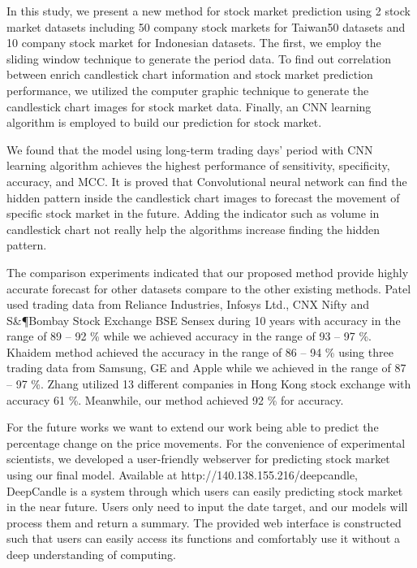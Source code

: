 \documentclass[10pt,twocolumn]{article}
\begin{document}
In this study, we present a new method for stock market prediction using 2 stock market datasets including 50 company stock markets for Taiwan50 datasets and 10 company stock market for Indonesian datasets. The first, we employ the sliding window technique to generate the period data. To find out correlation between enrich candlestick chart information and stock market prediction performance, we utilized the computer graphic technique to generate the candlestick chart images for stock market data. Finally, an CNN learning algorithm is employed to build our prediction for stock market.
\par
We found that the model using long-term trading days’ period with CNN learning algorithm achieves the highest performance of sensitivity, specificity, accuracy, and MCC. It is proved that Convolutional neural network can find the hidden pattern inside the candlestick chart images to forecast the movement of specific stock market in the future. Adding the indicator such as volume in candlestick chart not really help the algorithms increase finding the hidden pattern.
\par
The comparison experiments indicated that our proposed method provide highly accurate forecast for other datasets compare to the other existing methods. Patel used trading data from Reliance Industries, Infosys Ltd., CNX Nifty and S\&\P Bombay Stock Exchange BSE Sensex during 10 years with accuracy in the range of 89 – 92 \% while we achieved accuracy in the range of 93 – 97 \%. Khaidem method achieved the accuracy in the range of 86 – 94 \% using three trading data from Samsung, GE and Apple while we achieved in the range of 87 – 97 \%. Zhang utilized 13 different companies in Hong Kong stock exchange with accuracy 61 \%. Meanwhile, our method achieved 92 \% for accuracy. 
\par
For the future works we want to extend our work being able to predict the percentage change on the price movements. For the convenience of experimental scientists, we developed a user-friendly webserver for predicting stock market using our final model. Available at http://140.138.155.216/deepcandle, DeepCandle is a system through which users can easily predicting stock market in the near future. Users only need to input the date target, and our models will process them and return a summary. The provided web interface is constructed such that users can easily access its functions and comfortably use it without a deep understanding of computing.




\end{document}
